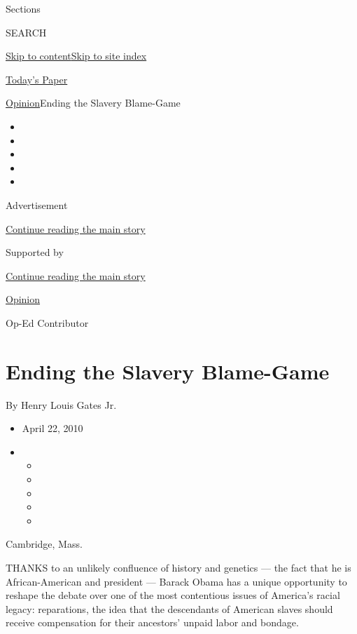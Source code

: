 Sections

SEARCH

\protect\hyperlink{site-content}{Skip to
content}\protect\hyperlink{site-index}{Skip to site index}

\href{https://myaccount.nytimes3xbfgragh.onion/auth/login?response_type=cookie\&client_id=vi}{}

\href{https://www.nytimes3xbfgragh.onion/section/todayspaper}{Today's
Paper}

\href{/section/opinion}{Opinion}\textbar{}Ending the Slavery Blame-Game

\begin{itemize}
\item
\item
\item
\item
\item
\end{itemize}

Advertisement

\protect\hyperlink{after-top}{Continue reading the main story}

Supported by

\protect\hyperlink{after-sponsor}{Continue reading the main story}

\href{/section/opinion}{Opinion}

Op-Ed Contributor

\hypertarget{ending-the-slavery-blame-game}{%
\section{Ending the Slavery
Blame-Game}\label{ending-the-slavery-blame-game}}

By Henry Louis Gates Jr.

\begin{itemize}
\item
  April 22, 2010
\item
  \begin{itemize}
  \item
  \item
  \item
  \item
  \item
  \end{itemize}
\end{itemize}

Cambridge, Mass.

THANKS to an unlikely confluence of history and genetics --- the fact
that he is African-American and president --- Barack Obama has a unique
opportunity to reshape the debate over one of the most contentious
issues of America's racial legacy: reparations, the idea that the
descendants of American slaves should receive compensation for their
ancestors' unpaid labor and bondage.

